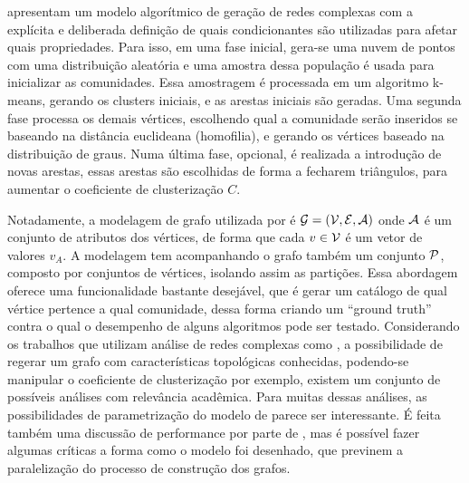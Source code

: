 \documentclass[notes.tex]{subfiles}
\begin{document}
 apresentam um modelo algorítmico de geração de redes complexas com a explícita e deliberada definição de quais condicionantes são utilizadas para afetar quais propriedades.
Para isso, em uma fase inicial, gera-se uma nuvem de pontos com uma distribuição aleatória e uma amostra dessa população é usada para inicializar as comunidades.
Essa amostragem é processada em um algoritmo k-means, gerando os clusters iniciais, e as arestas iniciais são geradas.
Uma segunda fase processa os demais vértices, escolhendo qual a comunidade serão inseridos se baseando na distância euclideana (homofilia), e gerando os vértices baseado na distribuição de graus.
Numa última fase, opcional, é realizada a introdução de novas arestas, essas arestas são escolhidas de forma a fecharem triângulos, para aumentar o coeficiente de clusterização $C$.

Notadamente, a modelagem de grafo utilizada por  é $\operatorname{\mathcal{G}} = (\operatorname{\mathcal{V}}, \operatorname{\mathcal{E}}, \operatorname{\mathcal{A}})$ onde  $\operatorname{\mathcal{A}}$ é um conjunto de atributos dos vértices, de forma que cada $v \in \operatorname{\mathcal{V}}$ é um vetor de valores  $v_A$.
A modelagem tem acompanhando o grafo também um conjunto $\operatorname{\mathcal{P}}$, composto por conjuntos de vértices, isolando assim as partições.
Essa abordagem oferece uma funcionalidade bastante desejável, que é gerar um catálogo de qual vértice pertence a qual comunidade, dessa forma criando um ``ground truth'' contra o qual o desempenho de alguns algoritmos pode ser testado.
Considerando os trabalhos que utilizam análise de redes complexas como , a possibilidade de regerar um grafo com características topológicas conhecidas, podendo-se manipular o coeficiente de clusterização por exemplo, existem um conjunto de possíveis análises com relevância acadêmica.
Para muitas dessas análises, as possibilidades de parametrização do modelo de  parece ser interessante.
É feita também uma discussão de performance por parte de , mas é possível fazer algumas críticas a forma como o modelo foi desenhado, que previnem a paralelização do processo de construção dos grafos.
\end{document}
